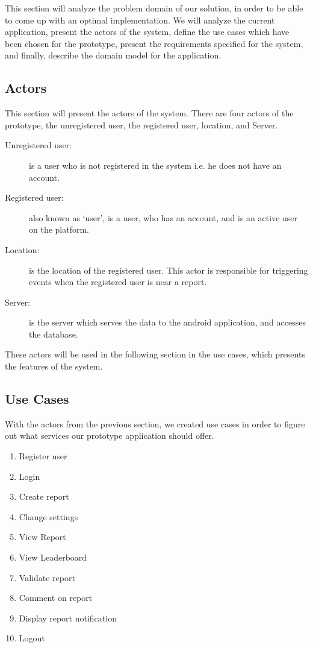 
This section will analyze the problem domain of our solution, in order to be able to come up with an optimal implementation. We will analyze the current application, present the actors of the system, define the use cases which have been chosen for the prototype, present the requirements specified for the system, and finally, describe the domain model for the application.

%
\subsection{Actors}
This section will present the actors of the system. There are four actors of the prototype, the unregistered user, the registered user, location, and Server.

\begin{description}
\item [Unregistered user:] is a user who is not registered in the system i.e. he does not have an account.
\item [Registered user:] also known as ‘user’, is a user, who has an account, and is an active user on the platform.
\item [Location:] is the location of the registered user. This actor is responsible for triggering events when the registered user is near a report.
\item [Server:] is the server which serves the data to the android application, and accesses the database.
\end{description}
These actors will be used in the following section in the use cases, which presents the features of the system.


\subsection{Use Cases}
With the actors from the previous section, we created use cases in order to figure out what services our prototype application should offer.

\begin{enumerate}[label=UC\arabic*]
\item Register user
\item Login
\item Create report
\item Change settings
\item View Report
\item View Leaderboard
\item Validate report
\item Comment on report
\item Display report notification
\item Logout
\end{enumerate}

